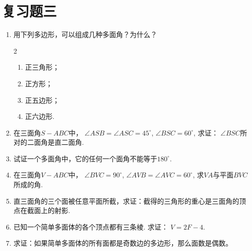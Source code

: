 \section*{复习题三}
\begin{enumerate}

    \item 用下列多边形，可以组成几种多面角？为什么？
\begin{multicols}{2}
\begin{enumerate}[(1)]
   \item 正三角形；  \item 正方形；  \item 正五边形；  \item 正六边形.
\end{enumerate}
\end{multicols}
    \item 在三面角$S-ABC$中， $\angle ASB=\angle ASC=45^{\circ}$,  $\angle BSC= 60^{\circ}$, 求证： $\angle BSC$所对的二面角是直二面角.

    \item 试证一个多面角中，它的任何一个面角不能等于$180^{\circ}$.

    \item 在三面角$V-ABC$中， $\angle BVC=90^{\circ}$, $\angle AVB=\angle AVC  =60^{\circ}$, 求$VA$与平面$BVC$所成的角.

    \begin{center}
\end{center}


    \item 直三面角的三个面被任意平面所截，求证：截得的三角形的重心是三面角的顶点在截面上的射影.

    \item 已知一个简单多面体的各个顶点都有三条棱. 求证： $V=2F-4$.

    \item 求证：如果简单多面体的所有面都是奇数边的多边形，那么面数是偶数。
\end{enumerate}





